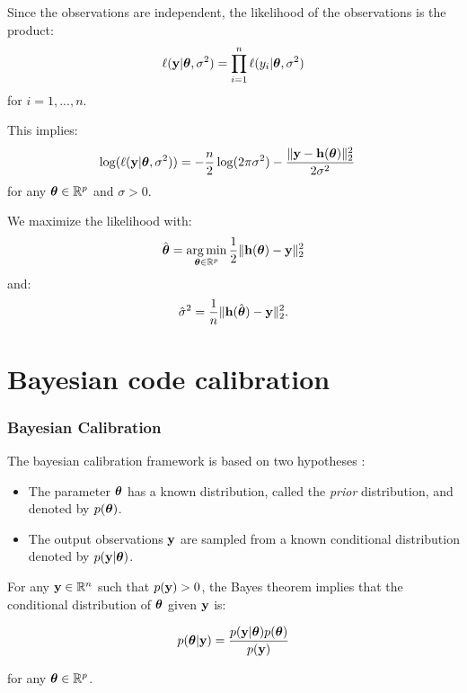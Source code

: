 \documentclass[aspectratio=169]{beamer}
\begin{document}

\begin{frame}
Since the observations are independent, the likelihood of the observations is 
the product:
$$
\ell({\bf y}|\boldsymbol{\theta},\sigma^2) = 
\prod_{i=1}^n \ell(y_i|\boldsymbol{\theta},\sigma^2)
$$
for $i=1,...,n$. 

This implies:
\begin{align*}
\log(\ell({\bf y}|\boldsymbol{\theta},\sigma^2)) 
&= -\frac{n}{2} \log(2\pi \sigma^2)
-\frac{\|{\bf y} - {\bf h}(\boldsymbol{\theta})\|_2^2}{2 \sigma^2}
\end{align*}
for any $\boldsymbol{\theta}\in\mathbb{R}^p$ and $\sigma>0$. 

We maximize the likelihood with:
\begin{align*}
\hat{\boldsymbol{\theta}}
= \operatorname*{arg\,min}_{\boldsymbol{\theta}\in\mathbb{R}^p} \frac{1}{2} \| {\bf h}(\boldsymbol{\theta}) - {\bf y}\|_2^2
\end{align*}
and:
\begin{align*}
\hat{\sigma}^2
= \frac{1}{n} \| {\bf h}(\hat{\boldsymbol{\theta}}) - {\bf y}\|_2^2.
\end{align*}

\end{frame}

\section{Bayesian code calibration}

\begin{frame}
\frametitle{Bayesian Calibration}

The bayesian calibration framework is based on two hypotheses 
\cite{Tarantola2005, Asch2016} :

\begin{itemize}
\item The parameter $\boldsymbol{\theta}$ has a
known distribution, called the \emph{prior} distribution, and denoted by
$p(\boldsymbol{\theta})$.
\item The output observations
${\bf y}$ are sampled from a known
conditional distribution denoted by $p({\bf y} | \boldsymbol{\theta})$.
\end{itemize}


\vspace{15pt}

For any ${\bf y}\in\mathbb{R}^{n}$ such that $p({\bf y})>0$,
the Bayes theorem implies that the conditional distribution of
$\boldsymbol{\theta}$ given ${\bf y}$ is:

$$
p(\boldsymbol{\theta} | {\bf y}) = \frac{p({\bf y} | \boldsymbol{\theta}) p(\boldsymbol{\theta})}{p({\bf y})}
$$

for any $\boldsymbol{\theta}\in\mathbb{R}^p$.

\end{frame}
\end{document}
